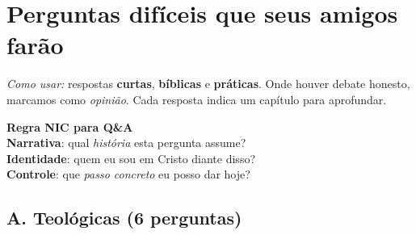 \chapter{Perguntas difíceis que seus amigos farão}
\noindent\textit{Como usar:} respostas \textbf{curtas}, \textbf{bíblicas} e \textbf{práticas}. Onde houver debate honesto, marcamos como \emph{opinião}. Cada resposta indica um capítulo para aprofundar.

\begin{nicbox}
\textbf{Regra NIC para Q\&A}\\
\textbf{Narrativa}: qual \emph{história} esta pergunta assume?\\
\textbf{Identidade}: quem eu sou em Cristo diante disso?\\
\textbf{Controle}: que \emph{passo concreto} eu posso dar hoje?
\end{nicbox}

\section*{A. Teológicas (6 perguntas)}

